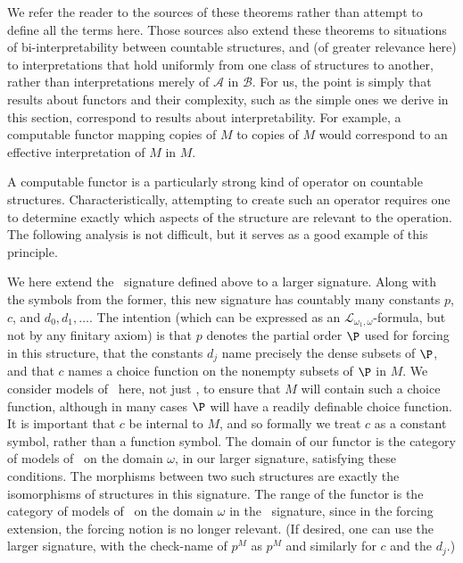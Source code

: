 \documentclass{amsart}
\begin{document}
 We refer the reader to the sources of these theorems rather than attempt
 to define all the terms here.  Those sources also extend these theorems
 to situations of bi-interpretability between countable structures, and (of greater relevance here)
 to interpretations that hold uniformly from one class of structures to another,
 rather than interpretations merely of $\mathcal A$ in $\mathcal B$.  For us, the point is simply
 that results about functors and their complexity, such as the simple ones
 we derive in this section, correspond to results about interpretability.
 For example, a computable functor mapping copies of $M$ to copies
 of $M$ would correspond to an effective interpretation of $M$ in $M$.
 
 A computable functor is a particularly strong kind of operator on countable structures.
 Characteristically, attempting to create such an operator requires one to determine
 exactly which aspects of the structure are relevant to the operation.
 The following analysis is not difficult, but it serves as a good example of this principle.
 
 We here extend the \Levy\ signature defined above to a larger signature.
 Along with the symbols from the former, this new signature has countably many
 constants $p$, $c$, and $d_0,d_1,\ldots$.  The intention (which can be expressed
 as an $\mathcal{L}_{\omega_1,\omega}$-formula, but not by any finitary axiom) is that
 $p$ denotes the partial order $\P$ used for forcing in this structure,
 that the constants $d_j$ name precisely the dense subsets of $\P$,
 and that $c$ names a choice function on the nonempty subsets of $\P$ in $M$.
 We consider models of \ZFC\ here, not just \ZF, to ensure that $M$ will
 contain such a choice function, although in many cases $\P$ will
 have a readily definable choice function.  It is important
 that $c$ be internal to $M$, and so formally we treat $c$ as a constant symbol,
 rather than a function symbol.
 The domain of our functor is the category of models of \ZFC\ on the domain $\omega$,
 in our larger signature, satisfying these conditions.
 The morphisms between two such structures are exactly the isomorphisms of structures
 in this signature.  The range of the functor is the category of models of \ZFC\ on the
 domain $\omega$ in the \Levy\ signature, since in the forcing extension,
 the forcing notion is no longer relevant.  (If desired, one can use the larger signature, with the check-name of $p^M$ as $p^{M}$ and similarly for $c$ and the $d_j$.)
 
\end{document}
